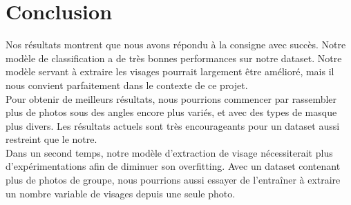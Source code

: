 \documentclass{article}
\begin{document}
\section{Conclusion}
Nos résultats montrent que nous avons répondu à la consigne avec succès. Notre modèle de classification a de très bonnes performances sur notre dataset. Notre modèle servant à extraire les visages pourrait largement être amélioré, mais il nous convient parfaitement dans le contexte de ce projet.\\
Pour obtenir de meilleurs résultats, nous pourrions commencer par rassembler plus de photos sous des angles encore plus variés, et avec des types de masque plus divers. Les résultats actuels sont très encourageants pour un dataset aussi restreint que le notre.\\ Dans un second temps, notre modèle d'extraction de visage nécessiterait plus d'expérimentations afin de diminuer son overfitting. Avec un dataset contenant plus de photos de groupe, nous pourrions aussi essayer de l'entraîner à extraire un nombre variable de visages depuis une seule photo.\\\\
\end{document}
